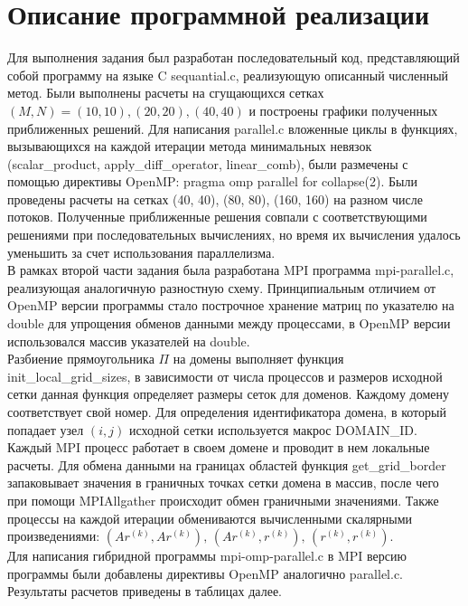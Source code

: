 \documentclass[oneside,final,14pt]{extreport}
\begin{document}
\section{Описание программной реализации}
\noindent
Для выполнения задания был разработан последовательный код, представляющий
собой программу на языке C sequantial.c, реализующую описанный численный метод.
Были выполнены расчеты на сгущающихся сетках
\( (M, N) = (10, 10), (20, 20), (40, 40) \) и построены графики
полученных приближенных решений.
Для написания parallel.c вложенные циклы в функциях,
вызывающихся на каждой итерации метода минимальных
невязок (scalar\_product, apply\_diff\_operator, linear\_comb), были
размечены с помощью директивы OpenMP: pragma omp parallel for collapse(2). 
Были проведены расчеты на сетках (40, 40), (80, 80), (160, 160) на разном
числе потоков. Полученные приближенные решения совпали с соответствующими
решениями при последовательных вычислениях, но время их вычисления удалось
уменьшить за счет использования параллелизма. \\
В рамках второй части задания была разработана MPI программа mpi-parallel.c,
реализующая аналогичную разностную схему. Принципиальным отличием от
OpenMP версии программы стало построчное хранение матриц по указателю на
double для упрощения обменов данными между процессами,
в OpenMP версии использовался массив указателей на double.\\
Разбиение прямоугольника \( \Pi \) на домены выполняет функция
init\_local\_grid\_sizes, в зависимости от числа процессов и размеров
исходной сетки данная функция определяет размеры сеток для доменов.
Каждому домену соответствует свой номер. Для определения идентификатора
домена, в который попадает узел \( (i, j) \) исходной сетки используется
макрос DOMAIN\_ID. Каждый MPI процесс работает в своем домене и проводит
в нем локальные расчеты. Для обмена данными на границах областей
функция get\_grid\_border запаковывает значения в граничных точках сетки
домена в массив, после чего при помощи MPIAllgather происходит обмен
граничными значениями. Также процессы на каждой итерации обмениваются
вычисленными скалярными произведениями:
\( (A r^{(k)}, A r^{(k)}), \, (A r^{(k)}, r^{(k)}), \, (r^{(k)}, r^{(k)}) \).\\
Для написания гибридной программы mpi-omp-parallel.c в MPI версию программы
были добавлены директивы OpenMP аналогично parallel.c. \\
Результаты расчетов приведены в таблицах далее.

\newpage
\end{document}
